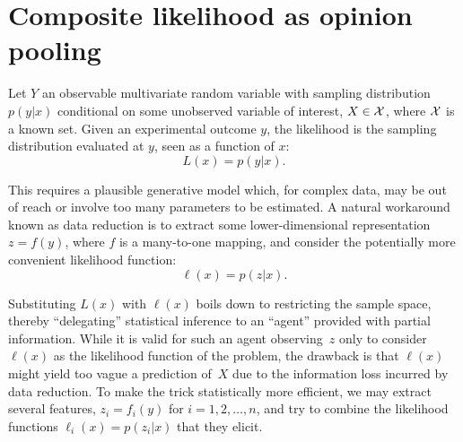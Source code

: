 \documentclass[english]{scrartcl}
\begin{document}







\section{Composite likelihood as opinion pooling}
\label{sec:log_pool}

Let $Y$ an observable multivariate random variable with sampling distribution $p(y|x)$ conditional on some unobserved variable of interest, $X\in{\cal X}$, where ${\cal X}$ is a known set. Given an experimental outcome $y$, the likelihood is the sampling distribution evaluated at $y$, seen as a function of $x$:
$$
L(x) = p(y|x)
.
$$

This requires a plausible generative model which, for complex data, may be out of reach or involve too many parameters to be estimated. A natural workaround known as data reduction is to extract some lower-dimensional representation $z=f(y)$, where $f$ is a many-to-one mapping, and consider the potentially more convenient likelihood function:
$$
\ell(x) = p(z|x)
.
$$

Substituting $L(x)$ with $\ell(x)$ boils down to restricting the sample space, thereby  ``delegating'' statistical inference to an ``agent'' provided with partial information. While it is valid for such an agent observing~$z$ only to consider $\ell(x)$ as the likelihood function of the problem, the drawback is that $\ell(x)$ might yield too vague a prediction of~$X$ due to the information loss incurred by data reduction. To make the trick statistically more efficient, we may extract several features, $z_i=f_i(y)$ for $i=1,2,\ldots,n$, and try to combine the likelihood functions $\ell_i(x) = p(z_i|x)$ that they elicit.
\end{document}

